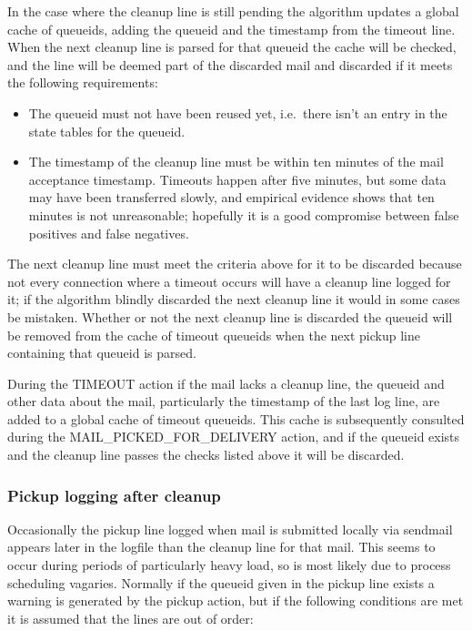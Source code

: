 \documentclass[a4paper,12pt,draft]{article}
\begin{document}
In the case where the cleanup line is still pending the algorithm updates a
global cache of queueids, adding the queueid and the timestamp from the
timeout line.  When the next cleanup line is parsed for that queueid the
cache will be checked, and the line will be deemed part of the discarded
mail and discarded if it meets the following requirements:

\begin{itemize}

    \item The queueid must not have been reused yet, i.e.\ there isn't an
        entry in the state tables for the queueid.

    \item The timestamp of the cleanup line must be within ten minutes of
        the mail acceptance timestamp.  Timeouts happen after five minutes,
        but some data may have been transferred slowly, and empirical
        evidence shows that ten minutes is not unreasonable; hopefully it
        is a good compromise between false positives and false negatives.

\end{itemize}

The next cleanup line must meet the criteria above for it to be discarded
because not every connection where a timeout occurs will have a cleanup
line logged for it; if the algorithm blindly discarded the next cleanup
line it would in some cases be mistaken.  Whether or not the next cleanup
line is discarded the queueid will be removed from the cache of timeout
queueids when the next pickup line containing that queueid is parsed.

During the TIMEOUT action if the mail lacks a cleanup line, the queueid and
other data about the mail, particularly the timestamp of the last log line,
are added to a global cache of timeout queueids.  This cache is
subsequently consulted during the MAIL\_PICKED\_FOR\_DELIVERY action, and
if the queueid exists and the cleanup line passes the checks listed above
it will be discarded.

\subsubsection{Pickup logging after cleanup}

\label{pickup logging after cleanup}

Occasionally the pickup line logged when mail is submitted locally via
sendmail appears later in the logfile than the cleanup line for that mail.
This seems to occur during periods of particularly heavy load, so is most
likely due to process scheduling vagaries.  Normally if the queueid given
in the pickup line exists a warning is generated by the pickup action, but
if the following conditions are met it is assumed that the lines are out of
order:
\end{document}
